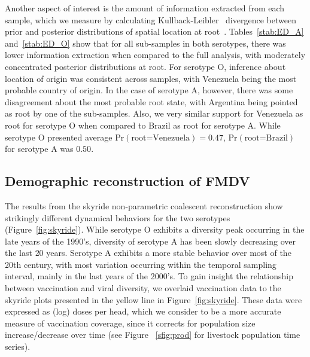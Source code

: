 \documentclass[10pt]{article}
\begin{document}
Another aspect of interest is the amount of information extracted from each sample, which we measure by calculating Kullback-Leibler~\cite{KL} divergence between prior and posterior distributions of spatial location at root~\cite{roots}.
Tables~\ref{stab:ED_A} and~\ref{stab:ED_O} show that for all sub-samples in both serotypes, there was lower information extraction when compared to the full analysis, with moderately concentrated posterior distributions at root.
For serotype O, inference about location of origin was consistent across samples, with Venezuela being the most probable country of origin.
In the case of serotype A, however, there was some disagreement about the most probable root state, with Argentina being pointed as root by one of the sub-samples.
Also, we very similar support for Venezuela as root for serotype O when compared to Brazil as root for serotype A.
While serotype O presented average $\mbox{Pr}(\text{root=Venezuela})=0.47$, $\mbox{Pr}(\text{root=Brazil})$ for serotype A was $0.50$.

\subsection*{Demographic reconstruction of FMDV}

The results from the skyride non-parametric coalescent reconstruction show strikingly different dynamical behaviors for the two serotypes (Figure~\ref{fig:skyride}).
While serotype O exhibits a diversity peak occurring in the late years of the 1990's, diversity of serotype A has been slowly decreasing over the last $20$ years.
Serotype A exhibits a more stable behavior over most of the 20th century, with most variation occurring within the temporal sampling interval, mainly in the last years of the 2000's.
To gain insight the relationship between vaccination and viral diversity, we overlaid vaccination data to the skyride plots presented in the yellow line in Figure~\ref{fig:skyride}.
These data were expressed as (log) doses per head, which we consider to be a more accurate measure of vaccination coverage, since it corrects for population size increase/decrease over time (see Figure ~\ref{sfig:prod} for livestock population time series). 
\end{document}
